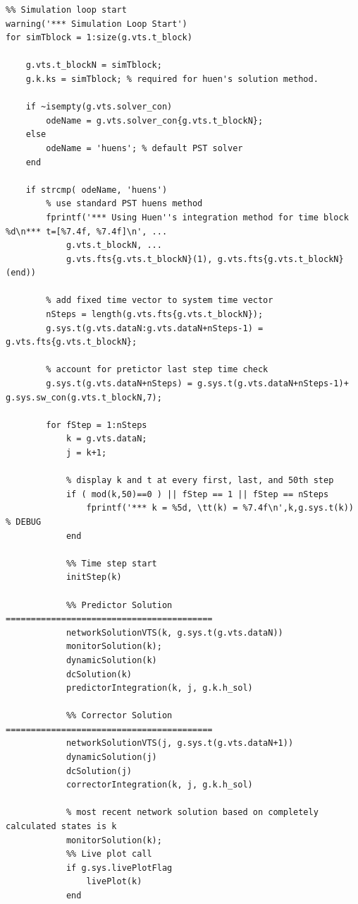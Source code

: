 \documentclass[12pt]{article}
\begin{document}
\begin{verbatim}
%% Simulation loop start
warning('*** Simulation Loop Start')
for simTblock = 1:size(g.vts.t_block)
    
    g.vts.t_blockN = simTblock;
    g.k.ks = simTblock; % required for huen's solution method.
    
    if ~isempty(g.vts.solver_con)
        odeName = g.vts.solver_con{g.vts.t_blockN};
    else
        odeName = 'huens'; % default PST solver
    end
    
    if strcmp( odeName, 'huens')
        % use standard PST huens method
        fprintf('*** Using Huen''s integration method for time block %d\n*** t=[%7.4f, %7.4f]\n', ...
            g.vts.t_blockN, ...
            g.vts.fts{g.vts.t_blockN}(1), g.vts.fts{g.vts.t_blockN}(end))
        
        % add fixed time vector to system time vector
        nSteps = length(g.vts.fts{g.vts.t_blockN});
        g.sys.t(g.vts.dataN:g.vts.dataN+nSteps-1) = g.vts.fts{g.vts.t_blockN};
        
        % account for pretictor last step time check
        g.sys.t(g.vts.dataN+nSteps) = g.sys.t(g.vts.dataN+nSteps-1)+ g.sys.sw_con(g.vts.t_blockN,7);
        
        for fStep = 1:nSteps
            k = g.vts.dataN;
            j = k+1;
            
            % display k and t at every first, last, and 50th step
            if ( mod(k,50)==0 ) || fStep == 1 || fStep == nSteps
                fprintf('*** k = %5d, \tt(k) = %7.4f\n',k,g.sys.t(k)) % DEBUG
            end
            
            %% Time step start
            initStep(k)
            
            %% Predictor Solution =========================================
            networkSolutionVTS(k, g.sys.t(g.vts.dataN))
            monitorSolution(k);
            dynamicSolution(k)
            dcSolution(k)
            predictorIntegration(k, j, g.k.h_sol)
            
            %% Corrector Solution =========================================
            networkSolutionVTS(j, g.sys.t(g.vts.dataN+1))
            dynamicSolution(j)
            dcSolution(j)
            correctorIntegration(k, j, g.k.h_sol)
            
            % most recent network solution based on completely calculated states is k
            monitorSolution(k);
            %% Live plot call
            if g.sys.livePlotFlag
                livePlot(k)
            end
            

\end{verbatim}
\end{document}
